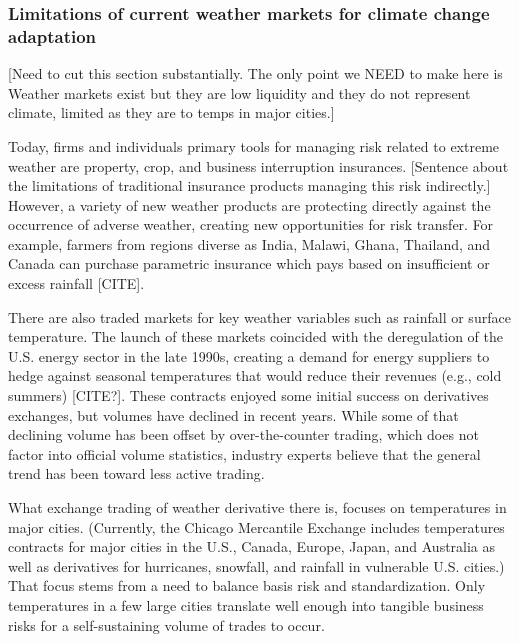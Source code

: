\documentclass[authoryear]{article}
\begin{document}
\subsubsection{Limitations of current weather markets for climate change adaptation}
[Need to cut this section substantially. The only point we NEED to make here is Weather markets exist but they are low liquidity and they do not represent climate, limited as they are to temps in major cities.]

Today, firms and individuals primary tools for managing risk related to extreme weather are property, crop, and business interruption insurances. [Sentence about the limitations of traditional insurance products managing this risk indirectly.]
However, a variety of new weather products are protecting directly against the occurrence of adverse weather, creating new opportunities for risk transfer.
For example, farmers from regions diverse as India, Malawi, Ghana, Thailand, and Canada can purchase parametric insurance which pays based on insufficient or excess rainfall [CITE]. 

There are also traded markets for key weather variables such as rainfall or surface temperature. The launch of these markets coincided with the deregulation of the U.S. energy sector in the late 1990s, creating a demand for energy suppliers to hedge against seasonal temperatures that would reduce their revenues (e.g., cold summers) [CITE?]. These contracts enjoyed some initial success on derivatives exchanges, but volumes have declined in recent years. While some of that declining volume has been offset by over-the-counter trading, which does not factor into official volume statistics, industry experts believe that the general trend has been toward less active trading.

What exchange trading of weather derivative there is, focuses on temperatures in major cities. (Currently, the Chicago Mercantile Exchange includes temperatures contracts for major cities in the U.S., Canada, Europe, Japan, and Australia as well as derivatives for hurricanes, snowfall, and rainfall in vulnerable U.S. cities.) That focus stems from a need to balance basis risk and standardization. Only temperatures in a few large cities translate well enough into tangible business risks for a self-sustaining volume of trades to occur.

\end{document}
